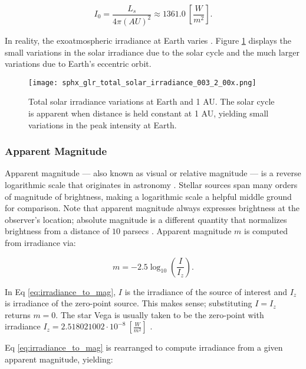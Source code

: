 \begin{equation} \label{eq:solar_constant_mean}
  I_0 = \frac{L_s}{4\pi \left(AU\right)^2} \approx 1361.0 \: \left[ \frac{W}{m^2} \right].
\end{equation}

In reality, the exoatmospheric irradiance at Earth varies \cite{frueh2019notes}. Figure \ref{fig:tsi} displays the small variations in the solar irradiance due to the solar cycle and the much larger variations due to Earth's eccentric orbit.

\begin{figure}[ht]
  \centering
  \texttt{[image: sphx\_glr\_total\_solar\_irradiance\_003\_2\_00x.png]}
  \caption{Total solar irradiance variations at Earth and 1 AU. The solar cycle is apparent when distance is held constant at 1 AU, yielding small variations in the peak intensity at Earth.}
  \label{fig:tsi}
\end{figure}

\subsubsection{Apparent Magnitude}

Apparent magnitude ---  also known as visual or relative magnitude --- is a reverse logarithmic scale
that originates in astronomy \cite{frueh2019notes}. Stellar sources span many orders of magnitude of brightness, making a
logarithmic scale a helpful middle ground for comparison. Note that apparent magnitude always
expresses brightness at the observer's location; absolute magnitude is a different quantity that
normalizes brightness from a distance of $10$ parsecs \cite{frueh2019notes}. Apparent magnitude $m$
is computed from irradiance via:

\begin{equation} \label{eq:irradiance_to_mag}
  m = -2.5 \log_{10}\left( \frac{I}{I_z} \right).
\end{equation}

In Eq \ref{eq:irradiance_to_mag}, $I$ is the irradiance of the source of interest and $I_z$ is
irradiance of the zero-point source. This makes sense; substituting $I = I_z$ returns
$m=0$. The star Vega is usually taken to be the zero-point with irradiance $I_z = 2.518021002\cdot
10^{-8} \: \left[ \frac{W}{m^2} \right]$ \cite{frueh2019notes}.

Eq \ref{eq:irradiance_to_mag} is rearranged to compute irradiance from a given apparent magnitude,
yielding:


